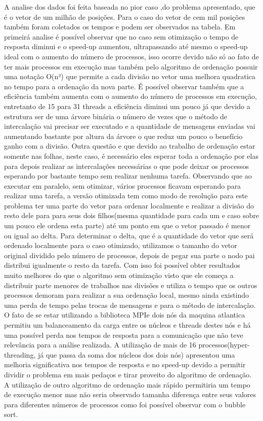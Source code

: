 \documentclass[11pt]{IEEEtran}
\begin{document}
A analise dos dados foi feita baseada no pior caso ,do problema apresentado, que é o vetor de um milhão de posições. Para o caso do vetor de cem mil posições também foram coletados os tempos e podem ser observados na tabela. 
Em primeirá analise é possível observar que no caso sem otimização o tempo de resposta diminui e o speed-up aumentou, ultrapassando até mesmo o speed-up ideal com o aumento do número de processos, isso ocorre devido não só ao fato de ter mais processos em execução mas também pelo algoritmo de ordenação possuir uma notação O(n²) que permite a cada divisão no vetor uma melhora quadratica no tempo para a ordenação da nova parte. É possível observar também que a eficiência também aumenta com o aumento do número de processos em execução, entretanto de 15 para 31 threads a eficiência diminui um pouco já que devido a estrutura ser de uma árvore binária o número de vezes que o método de intercalação vai precisar ser executado e a quantidade de mensagens enviadas vai aumentando bastante por altura da árvore o que reduz um pouco o benefício ganho com a divisão. Outra questão e que devido ao trabalho de ordenação estar somente nas folhas, neste caso, é necessário eles esperar toda a ordenação por elas para depois realizar as intercalações necessárias o que pode deixar os processos esperando por bastante tempo sem realizar nenhuma tarefa.
Observando que ao executar em paralelo, sem otimizar, vários processos ficavam esperando para realizar uma tarefa, a versão otimizada tem como modo de resolução para este problema ter uma parte do vetor para ordenar localmente e realizar a divisão do resto dele para para seus dois filhos(mesma quantidade para cada um e caso sobre um pouco ele ordena esta parte) até um ponto em que o vetor passado é menor ou igual ao delta. Para determinar o delta, que é a quantidade do vetor que será ordenado localmente para o caso otimizado, utilizamos o tamanho do vetor original dividido pelo número de processos, depois de pegar sua parte o nodo pai distribui igualmente o resto da tarefa. Com isso foi possível obter resultados muito melhores do que o algoritmo sem otimização visto que ele começa a distribuir parte menores de trabalhos nas divisões e utiliza o tempo que os outros processos  demoram para realizar a sua ordenação local, mesmo ainda existindo uma perda de tempo pelas trocas de mensagens e para o método de intercalação.
O fato de se estar utilizando a biblioteca MPI\@ e dois nós da maquina atlantica permitiu um balanceamento da carga entre os núcleos e threads destes nós e há uma possível perda nos tempos de resposta para a comunicação que não teve relevância para a análise realizada. A utilização de mais de 16 processos(hyper-threading, já que passa da soma dos núcleos dos dois nós) apresentou uma melhoria significativa nos tempos de resposta e no speed-up devido a permitir dividir o problema em mais pedaços e tirar proveito do algoritmo de ordenação. A utilização de outro algoritmo de ordenação mais rápido permitiria um tempo de execução menor mas não seria observado tamanha diferença entre seus valores para diferentes números de processos como foi possível observar com o bubble sort.
\end{document}
